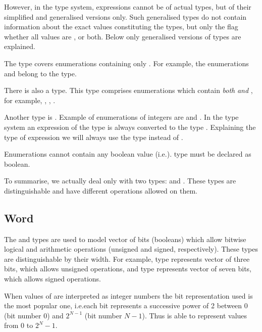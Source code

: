 However, in the \nusmv type system, expressions cannot be of actual
\Enum types, but of their simplified and generalised versions
only. Such generalised \Enum types do not contain information about
the exact values constituting the types, but only the flag whether all
values are  ,
 or both. Below only generalised versions
of \Enum types are explained.

The \SymbEnum type covers enumerations containing only . For example, the enumerations 
and  belong to the \SymbEnum type.

There is also a \IntSymbEnum type. 
This type comprises enumerations which contain \emph{both}
 \emph{and} , for
example, , ,
.

Another \Enum type is \IntEnum.
Example of enumerations of integers are  and . 
In the \nusmv type system an expression of the type \IntEnum
is always converted to the type \Integer. Explaining
the type of expression we will always use the type \Integer
instead of \IntEnum.

Enumerations cannot contain any boolean value (i.e.).
\Boolean type must be declared as boolean.

To summarise, we actually deal only with two \Enum types: \SymbEnum and
\IntSymbEnum. These types are distinguishable and have different operations
allowed on them.


\subsection{Word}
\label{Word Type}

The \UWord and \SWord types are used to model vector of bits (booleans) which
allow bitwise logical and arithmetic operations (unsigned and signed, respectively).
%
These types are distinguishable by their width. For example, type
\UWord[3] represents vector of three bits, which allows unsigned operations, and type
\SWord[7] represents vector of seven bits, which allows signed operations.

When values of \UWord[N] are interpreted as integer numbers the bit
representation used is the most popular one, i.e.\@ each bit represents
a successive power of 2 between $0$ (bit number 0) and $2^{N-1}$ (bit
number $N-1$). Thus \UWord[N] is able to represent values from 0 to
$2^{N}-1$. 

